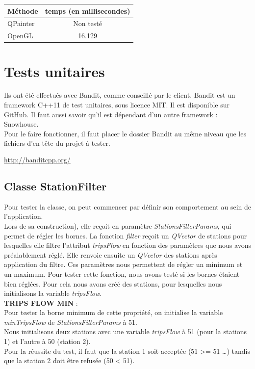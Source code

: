 \documentclass[12pt]{article}
\begin{document}
		\begin{center}
			\begin{tabular}{| l | c |}
			\hline
			\textbf{Méthode} & \textbf{temps (en millisecondes)} \\ \hline
			QPainter & Non testé\\ \hline
			OpenGL & 16.129 \\ \hline
		    \end{tabular}
	    \end{center}
		
		
	\section{Tests unitaires}
	Ils ont été effectués avec Bandit, comme conseillé par le client.
	Bandit est un framework C++11 de test unitaires, sous licence MIT. Il est disponible sur GitHub. 		Il faut aussi savoir qu’il est dépendant d’un autre framework : Snowhouse.\\

	Pour le faire fonctionner, il faut placer le dossier Bandit au même niveau que les fichiers d’en-tête du projet à tester.

	\url{http://banditcpp.org/}
	
		\subsection{Classe StationFilter}
		Pour tester la classe, on peut commencer par définir son comportement au sein de l’application.\\

		Lors de sa construction), elle reçoit en paramètre \textit{StationsFilterParams}, qui permet de régler les bornes. La fonction \textit{filter} reçoit un \textit{QVector} de stations pour lesquelles elle filtre l’attribut \textit{tripsFlow} en fonction des paramètres que nous avons préalablement réglé. Elle renvoie ensuite un \textit{QVector} des stations après application du filtre. Ces paramètres nous permettent de régler un minimum et un maximum. Pour tester cette fonction, nous avons testé si les bornes étaient bien réglées. Pour cela nous avons créé des stations, pour lesquelles nous initialisons la variable \textit{tripsFlow}.\\

		\textbf{TRIPS FLOW MIN} :\\
		Pour tester la borne minimum de cette propriété, on initialise la variable \textit{minTripsFlow} de \textit{StationsFilterParams} à 51.\\
		Nous initialisons deux stations avec une variable \textit{tripsFlow} à 51 (pour la stations 1) et l’autre à 50 (station 2).\\
		Pour la réussite du test, il faut que la station 1 soit acceptée (51 >= 51 …) tandis que la station 2 doit être refusée (50 < 51).\\
\end{document}
